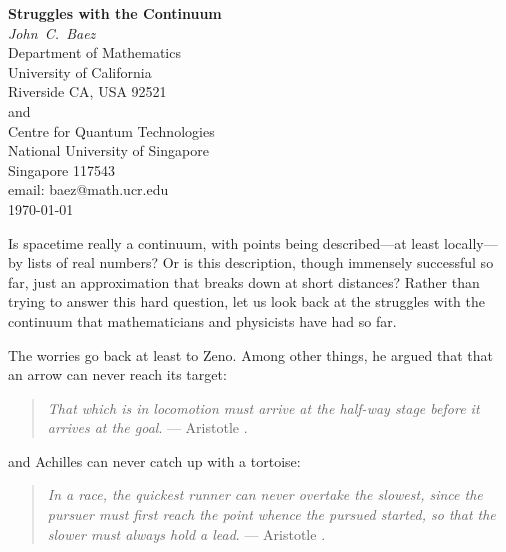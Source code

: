 \documentclass{article}
\begin{document}


\begin{center}   
  {\bf Struggles with the Continuum \\}   
  \vspace{0.3cm}
  {\em John\ C.\ Baez \\}
  \vspace{0.3cm}
  {\small
 Department of Mathematics \\
    University of California \\
  Riverside CA, USA 92521 \\ and \\
 Centre for Quantum Technologies  \\
    National University of Singapore \\
    Singapore 117543  \\    } 
  \vspace{0.3cm}   
  {\small email:  baez@math.ucr.edu \\} 
  \vspace{0.3cm}   
  {\small \today}
  \vspace{0.3cm}   
\end{center}   

Is spacetime really a continuum, with points being described---at least locally---by lists of  real numbers?  Or is this description, though immensely successful so far, just an approximation that breaks down at short distances?  Rather than trying to answer this hard question, let us look back at the struggles with the continuum that mathematicians and physicists have had so far.

The worries go back at least to Zeno.  Among other things, he argued that that an arrow can never reach its target:

\begin{quote}
\emph{That which is in locomotion must arrive at the half-way stage before it arrives at the goal}. ---  Aristotle \cite{AristotleZeno1}.
\end{quote}

\noindent
and Achilles can never catch up with a tortoise:

\begin{quote}
\emph{In a race, the quickest runner can never overtake the slowest, since the pursuer must first reach the point whence the pursued started, so that the slower must always hold a lead}. --- Aristotle \cite{AristotleZeno2}.
\end{quote}
\end{document}
